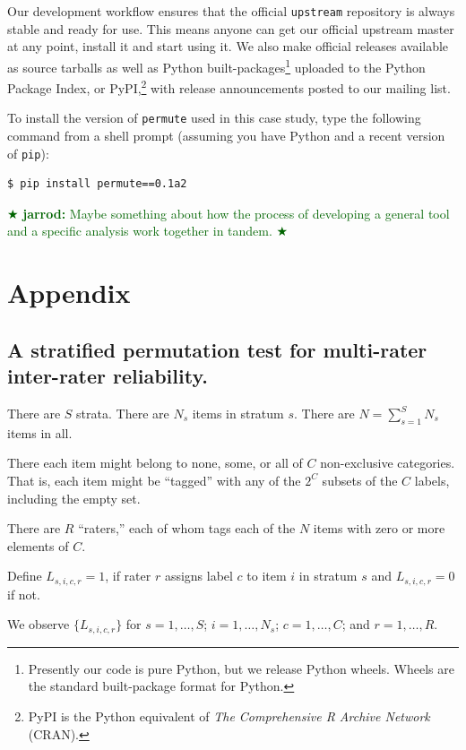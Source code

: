 \documentclass[]{article}
\newcommand{\jarrod}[1] { \textcolor{darkgreen} {
\ensuremath{\bigstar} {\bf jarrod:}  {#1}
\ensuremath{\bigstar} } }
\begin{document}
Our development workflow ensures that the official \texttt{upstream} repository
is always stable and ready for use.
This means anyone can get our official upstream master at any point, install it
and start using it.
We also make official releases available as source tarballs as well as Python
built-packages\footnote{Presently our code is pure Python, but we release
Python wheels.
Wheels are the standard built-package format for Python.} uploaded to the
Python Package Index, or PyPI,\footnote{PyPI is the Python equivalent of \emph{The
Comprehensive R Archive Network} (CRAN).} with release announcements posted to
our mailing list.

To install the version of \texttt{permute} used in this case study, type
the following command from a shell prompt (assuming you have Python and a
recent version of \texttt{pip}):
\begin{verbatim}
$ pip install permute==0.1a2
\end{verbatim}

\jarrod{
Maybe something about how the process of developing a general tool and a
specific analysis work together in tandem.}




\pagebreak

\section*{Appendix}

\subsection*{A stratified permutation test for multi-rater inter-rater reliability.}

There are $S$ strata.
There are $N_s$ items in stratum $s$.
There are $N = \sum_{s=1}^S N_s$ items in all.

There each item might belong to none, some, or all of $C$ non-exclusive categories.
That is, each item might be ``tagged'' with any of the $2^C$ subsets
of the $C$ labels, including the empty set.

There are $R$ ``raters,'' each of whom tags each of the $N$ items with zero
or more elements of $C$.

Define $L_{s,i,c,r} = 1$, if rater $r$ assigns label $c$ to item $i$ in stratum
$s$ and $L_{s,i,c,r} = 0$ if not.

We observe $\{ L_{s,i,c,r} \}$ for $s=1, \dots, S$;  $i=1, \dots, N_s$;
$c=1, \dots, C$; and $r=1, \dots, R$.
\end{document}
